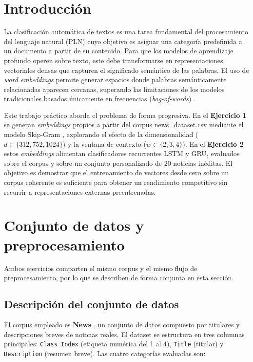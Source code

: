\documentclass{article}
\begin{document}
\newpage
\tableofcontents
\newpage

\section{Introducción}

La clasificación automática de textos es una tarea fundamental del procesamiento del lenguaje natural (PLN) cuyo objetivo es asignar una categoría predefinida a un documento a partir de su contenido. Para que los modelos de aprendizaje profundo operen sobre texto, este debe transformarse en representaciones vectoriales densas que capturen el significado semántico de las palabras. El uso de \textit{word embeddings} permite generar espacios donde palabras semánticamente relacionadas aparecen cercanas, superando las limitaciones de los modelos tradicionales basados únicamente en frecuencias (\textit{bag-of-words}) \cite{mikolov2013}.

Este trabajo práctico aborda el problema de forma progresiva. En el \textbf{Ejercicio 1} se generan \textit{embeddings} propios a partir del corpus news\_dataset.csv mediante el modelo Skip-Gram \cite{mikolov2013}, explorando el efecto de la dimensionalidad ($d \in \{312, 752, 1024\}$) y la ventana de contexto ($w \in \{2, 3, 4\}$). En el \textbf{Ejercicio 2} estos \textit{embeddings} alimentan clasificadores recurrentes LSTM y GRU, evaluados sobre el corpus y sobre un conjunto personalizado de 20 noticias inéditas. El objetivo es demostrar que el entrenamiento de vectores desde cero sobre un corpus coherente es suficiente para obtener un rendimiento competitivo sin recurrir a representaciones externas preentrenadas.

\section{Conjunto de datos y preprocesamiento}

Ambos ejercicios comparten el mismo corpus y el mismo flujo de preprocesamiento, por lo que se describen de forma conjunta en esta sección.

\subsection{Descripción del conjunto de datos}

El corpus empleado es \textbf{News} \cite{zhang2015}, un conjunto de datos compuesto por titulares y descripciones breves de noticias reales. El dataset se estructura en tres columnas principales: \texttt{Class Index} (etiqueta numérica del 1 al 4), \texttt{Title} (titular) y \texttt{Description} (resumen breve). Las cuatro categorías evaluadas son:
\end{document}

